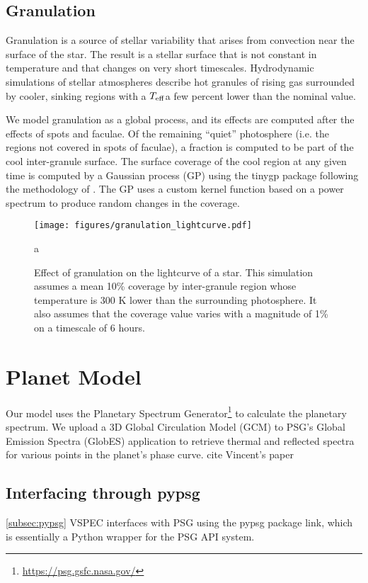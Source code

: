 \documentclass[twocolumn]{aastex631}
\newcommand{\teff}{$T_{\rm eff}$}
\newcommand{\TJ}[1]{\textcolor{tedcommentcolor}{#1}}
\begin{document}
\subsection{Granulation}
Granulation is a source of stellar variability that arises from convection near the surface of the star.
The result is a stellar surface that is not constant in temperature and that changes on very short timescales.
Hydrodynamic simulations of stellar atmospheres \citep[e.g.][]{magic2014} describe hot granules of rising gas surrounded by cooler,
sinking regions with a \teff a few percent lower than the nominal value.

We model granulation as a global process, and its effects are computed after the effects of spots and faculae.
Of the remaining ``quiet'' photosphere (i.e. the regions not covered in spots of faculae), a fraction is computed to be part of the cool
inter-granule surface. The surface coverage of the cool region at any given time is computed by a Gaussian process (GP) using
the {\sc tinygp} package \citep{foreman-mackey2024} following the methodology of \citet{gordon2020}.
The GP uses a custom kernel function based on a power spectrum \citep{anderson1990,kallinger2014} to produce random changes in the coverage.

\begin{figure}
    \centering
    \texttt{[image: figures/granulation\_lightcurve.pdf]}
    \caption{
        Effect of granulation on the lightcurve of a star. This simulation assumes a mean
        10\% coverage by inter-granule region whose temperature is 300 K lower than the surrounding photosphere.
        It also assumes that the coverage value varies with a magnitude of 1\% on a timescale of 6 hours.
        }
    \label{fig:gran_lc}
a\end{figure}

\section{Planet Model \label{sec:pl_model}}
Our model uses the Planetary Spectrum Generator\footnote{\href{https://psg.gsfc.nasa.gov/}{https://psg.gsfc.nasa.gov/}}
\citep[PSG,][]{villanueva2018} to calculate the planetary spectrum. We upload a 3D Global Circulation Model (GCM) to PSG's
Global Emission Spectra (GlobES) application to retrieve thermal and reflected spectra for various points in the planet's phase curve. \TJ{cite Vincent's paper}

\subsection{Interfacing through {\sc pypsg}}
\ref{subsec:pypsg}
{\sc VSPEC} interfaces with PSG using the {\sc pypsg} package \TJ{link}, which is essentially a Python wrapper for the PSG API system.
\end{document}
